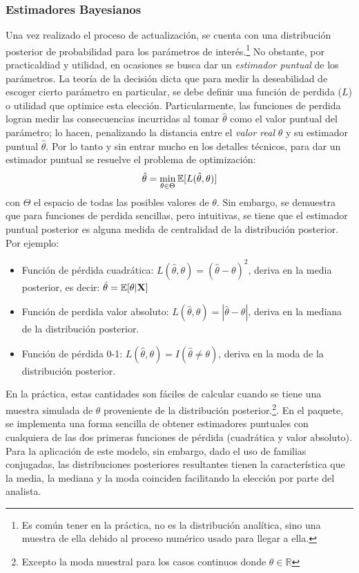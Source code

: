 \documentclass[../Main/Main.tex]{subfiles}
\begin{document}
\subsubsection{Estimadores Bayesianos}
Una vez realizado el proceso de actualización, se cuenta con una distribución posterior de probabilidad para los parámetros de interés.\footnote{Es común tener en la práctica, no es la distribución analítica, sino una muestra de ella debido al proceso numérico usado para llegar a ella.} No obstante, por practicaldiad y utilidad, en ocasiones se busca dar un \textit{estimador puntual} de los parámetros. La teoría de la decisión dicta que para medir la deseabilidad de escoger cierto parámetro en particular, se debe definir una función de perdida ($L$) o utilidad que optimice esta elección. Particularmente, las funciones de perdida logran medir las consecuencias incurridas al tomar $\hat{\theta}$ como el valor puntual del parámetro; lo hacen, penalizando la distancia entre el \emph{valor real} $\theta$ y su estimador puntual $\hat{\theta}$. Por lo tanto y sin entrar mucho en los detalles técnicos, para dar un estimador puntual se resuelve el problema de optimización: 
\begin{align}
\hat{\theta} = \min_{\theta \in{\Theta}}\mathbb{E}[L(\hat{\theta},\theta)]
\end{align}
con $\Theta$ el espacio de todas las posibles valores de $\theta$. Sin embargo, se demuestra que para funciones de perdida sencillas, pero intuitivas, se tiene que el estimador puntual posterior es alguna medida de centralidad de la distribución posterior. Por ejemplo:
\begin{itemize}[label={}]
	\item Función de pérdida cuadrática: $L(\hat{\theta},\theta) = (\hat{\theta}-\theta)^2$, deriva en la media posterior, es decir: $\hat{\theta} = \mathbb{E}[\theta|\mathbf{X}]$ 
	\item Función de perdida valor absoluto: $L(\hat{\theta},\theta) = |\hat{\theta}-\theta|$, deriva en la mediana de la distribución posterior.
	\item Función de pérdida 0-1:  $L(\hat{\theta},\theta) = I(\hat{\theta} \neq \theta)$, deriva en la moda de la distribución posterior. 
\end{itemize}
En la práctica, estas cantidades son fáciles de calcular cuando se tiene una muestra simulada de $\theta$ proveniente de la distribución posterior.\footnote{Excepto la moda muestral para los casos continuos donde $\theta\in\mathbb{R}$}. En el paquete, se implementa una forma sencilla de obtener estimadores puntuales con cualquiera de las dos primeras funciones de pérdida (cuadrática y valor absoluto). Para la aplicación de este modelo, sin embargo, dado el uso de familias conjugadas, las distribuciones posteriores resultantes tienen la característica que la media, la mediana y la moda coinciden facilitando la elección por parte del analista.
\end{document}
